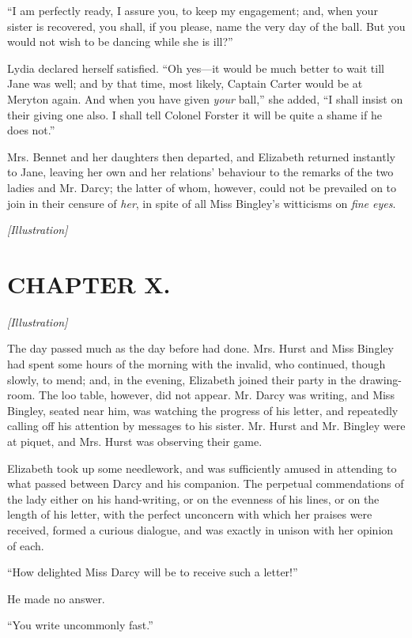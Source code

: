 \documentclass[12pt]{book}
\begin{document}
``I am perfectly ready, I assure you, to keep my engagement; and, when your sister is recovered, you shall, if you please, name the very day of the ball. But you would not wish to be dancing while she is ill?''

Lydia declared herself satisfied. ``Oh yes---it would be much better to wait till Jane was well; and by that time, most likely, Captain Carter would be at Meryton again. And when you have given \textit{your} ball,'' she added, ``I shall insist on their giving one also. I shall tell Colonel Forster it will be quite a shame if he does not.''

Mrs. Bennet and her daughters then departed, and Elizabeth returned instantly to Jane, leaving her own and her relations' behaviour to the remarks of the two ladies and Mr. Darcy; the latter of whom, however, could not be prevailed on to join in their censure of \textit{her}, in spite of all Miss Bingley's witticisms on \textit{fine eyes}.

\emph{[Illustration]}

\chapter{CHAPTER X.}

\emph{[Illustration]}

The day passed much as the day before had done. Mrs. Hurst and Miss Bingley had spent some hours of the morning with the invalid, who continued, though slowly, to mend; and, in the evening, Elizabeth joined their party in the drawing-room. The loo table, however, did not appear. Mr. Darcy was writing, and Miss Bingley, seated near him, was watching the progress of his letter, and repeatedly calling off his attention by messages to his sister. Mr. Hurst and Mr. Bingley were at piquet, and Mrs. Hurst was observing their game.

Elizabeth took up some needlework, and was sufficiently amused in attending to what passed between Darcy and his companion. The perpetual commendations of the lady either on his hand-writing, or on the evenness of his lines, or on the length of his letter, with the perfect unconcern with which her praises were received, formed a curious dialogue, and was exactly in unison with her opinion of each.

``How delighted Miss Darcy will be to receive such a letter!''

He made no answer.

``You write uncommonly fast.''
\end{document}
